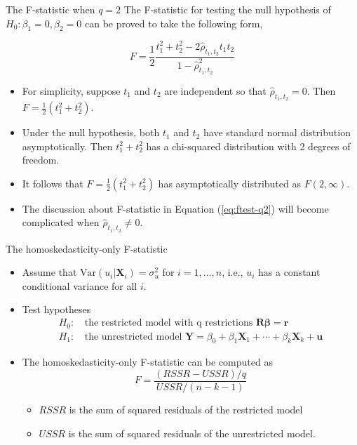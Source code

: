 \documentclass[presentation,10pt]{beamer}
\newcommand{\var}{\mathrm{Var}}
\begin{document}
\begin{frame}[label={sec:orgfd6bcdf}]{The F-statistic when \(q=2\)}
The F-statistic for testing the null hypothesis of \(H_0: \beta_1 = 0,
\beta_2 = 0\) can be proved to take the following form,

\begin{equation}
\label{eq:ftest-q2}
F = \frac{1}{2}\frac{t_1^2 + t_2^2 - 2 \hat{\rho}_{t_1,t_2}t_1t_2}{1 - \hat{\rho}_{t_1,t_2}^2}
\end{equation}

\begin{itemize}
\item For simplicity, suppose \(t_1\) and \(t_2\) are independent so that
\(\hat{\rho}_{t_1,t_2} = 0\). Then \(F = \frac{1}{2}(t_1^2 +
  t_2^2)\).
\item Under the null hypothesis, both \(t_1\) and \(t_2\) have standard normal
distribution asymptotically. Then \(t^2_1 + t^2_2\) has a chi-squared
distribution with 2 degrees of freedom.
\item It follows that \(F = \frac{1}{2}(t^2_1 + t^2_2)\) has asymptotically
distributed as \(F(2, \infty)\).
\item The discussion about F-statistic in Equation (\ref{eq:ftest-q2})
will become complicated when \(\hat{\rho}_{t_1,t_2} \neq 0\).
\end{itemize}
\end{frame}

\begin{frame}[label={sec:orgccdf2e3}]{The homoskedasticity-only F-statistic}
\begin{itemize}
\item Assume that \(\var(u_i | \mathbf{X}_i) = \sigma^2_u\) for \(i
  = 1, \ldots, n\), i.e., \(u_i\) has a constant conditional variance for
all \(i\).
\item Test hypotheses
\begin{align*}
H_0:\, & \text{the restricted model with q restrictions } \mathbf{R}\boldsymbol{\beta} = \mathbf{r}  \\
H_1:\, & \text{the unrestricted model } \mathbf{Y} = \beta_0 + \beta_{1} \mathbf{X}_{1} + \cdots + \beta_k \mathbf{X}_k + \mathbf{u}
\end{align*}
\item The \alert{homoskedasticity-only} F-statistic can be computed as
\begin{equation}
\label{eq:ftest-hm}
F = \frac{(RSSR - USSR)/q}{USSR/(n-k-1)}
\end{equation}
\begin{itemize}
\item \(RSSR\) is the sum of squared residuals of the restricted model
\item \(USSR\) is the sum of squared residuals of the unrestricted model.
\end{itemize}
\end{itemize}
\end{frame}
\end{document}
